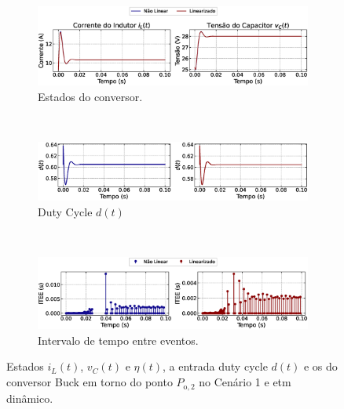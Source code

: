 \begin{figure}[H]
  \centering
  \captionsetup{justification=centering}
  \begin{subfigure}{1.\textwidth}
    \centering
    \includegraphics[width=1.\textwidth]{figuras/dynamic-etm/buck/sim1/op2/result.eps}
    \caption{Estados do conversor.}
    \label{fig:buck_converter_constant_pcpl_dynamic_etm_op2_a}
  \end{subfigure}
  \\[6pt]
  \begin{subfigure}{1.\textwidth}
    \centering
    \includegraphics[width=1.\textwidth]{figuras/dynamic-etm/buck/sim1/op2/duty-cycle.eps}
    \caption{Duty Cycle $d(t)$}
    \label{fig:buck_converter_constant_pcpl_dynamic_etm_op2_b}
  \end{subfigure}
  \\[6pt]
  \begin{subfigure}{1.\textwidth}
    \centering
    \includegraphics[width=1.\textwidth]{figuras/dynamic-etm/buck/sim1/op2/inter-event-times.eps}
    \caption{Intervalo de tempo entre eventos.}
    \label{fig:buck_converter_constant_pcpl_dynamic_etm_op2_c}
  \end{subfigure}
  \caption{Estados $i_L(t)$, $v_C(t)$ e $\eta(t)$, a entrada duty cycle $d(t)$ e os  do conversor Buck em torno do ponto $P_{\mathrm{o}, 2}$ no Cenário 1 e \acrshort{etm} dinâmico.}
  \label{fig:buck_converter_constant_pcpl_dynamic_etm_op2}
\end{figure}

